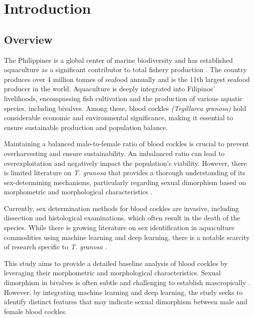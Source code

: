\chapter{Introduction}
\label{sec:researchdesc}    %

\section{Overview}
\label{sec:overview}

The Philippines is a global center of marine biodiversity and has established aquaculture as a significant contributor to total fishery production \cite{aypa2000, bfar2019}. The country produces over 4 million tonnes of seafood annually and is the 11th largest seafood producer in the world. Aquaculture is deeply integrated into Filipinos' livelihoods, encompassing fish cultivation and the production of various aquatic species, including bivalves. Among these, blood cockles \textit{(Tegillarca granosa)} hold considerable economic and environmental significance, making it essential to ensure sustainable production and population balance.

Maintaining a balanced male-to-female ratio of blood cockles is crucial to prevent overharvesting and ensure sustainability. An imbalanced ratio can lead to overexploitation and negatively impact the population's viability. However, there is limited literature on \textit{T. granosa} that provides a thorough understanding of its sex-determining mechanisms, particularly regarding sexual dimorphism based on morphometric and morphological characteristics \cite{breton2017sex}.

Currently, sex determination methods for blood cockles are invasive, including dissection and histological examinations, which often result in the death of the species. While there is growing literature on sex identification in aquaculture commodities using machine learning and deep learning, there is a notable scarcity of research specific to \textit{T. granosa} \cite{miranda2023}.

This study aims to provide a detailed baseline analysis of blood cockles by leveraging their morphometric and morphological characteristics. Sexual dimorphism in bivalves is often subtle and challenging to establish mascropically \cite{karapunar2021}. However, by integrating machine learning and deep learning, the study seeks to identify distinct features that may indicate sexual dimorphism between male and female blood cockles.

